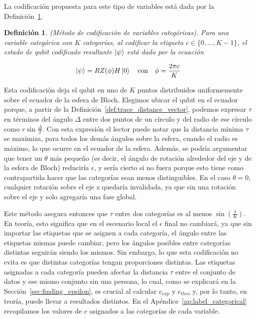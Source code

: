 \documentclass{ieeeaccess}
\newtheorem{definition}{Definición}[section]
\begin{document}
La codificación propuesta para este tipo de variables está dada por la Definición~\ref{def:encoding_categorical}.

\begin{definition}
  (Método de codificación de variables categóricas). Para una variable categórica con $K$ categorías, al codificar la etiqueta $c \in \{0, \dots, K - 1\}$, el estado de qubit codificado resultante $\ket{\psi}$ está dado por la ecuación

  \[
    \ket{\psi} = RZ(\phi)H\ket{0} \quad \text{con} \quad \phi = \frac{2\pi c}{K}
  \]
  \label{def:encoding_categorical}
\end{definition}

Esta codificación deja el qubit en uno de $K$ puntos distribuidos uniformemente sobre el ecuador de la esfera de Bloch. Elegimos ubicar el qubit en el ecuador porque, a partir de la Definición~\ref{def:trace_distance_vector}, podemos expresar $\tau$ en términos del ángulo $\Delta$ entre dos puntos de un círculo y del radio de ese círculo como $r\sin{\frac{\Delta}{2}}$. Con esta expresión el lector puede notar que la distancia mínima $\tau$ se maximiza, para todos los demás ángulos sobre la esfera, cuando el radio es máximo, lo que ocurre en el ecuador de la esfera. Además, se podría argumentar que tener un $\theta$ más pequeño (es decir, el ángulo de rotación alrededor del eje y de la esfera de Bloch) reduciría $\epsilon$, y sería cierto si no fuera porque esto tiene como contrapartida hacer que las categorías sean menos distinguibles. En el caso $\theta = 0$, cualquier rotación sobre el eje z quedaría invalidada, ya que sin una rotación sobre el eje y solo agregaría una fase global.

Este método asegura entonces que $\tau$ entre dos categorías es al menos $\sin(\frac{\pi}{K})$. En teoría, esto significa que en el escenario local el $\epsilon$ final no cambiará, ya que sin importar las etiquetas que se asignen a cada categoría, el ángulo entre las etiquetas mismas puede cambiar, pero los ángulos posibles entre categorías distintas seguirán siendo los mismos. Sin embargo, lo que esta codificación no evita es que distintas categorías tengan proporciones distintas. Las etiquetas asignadas a cada categoría pueden afectar la distancia $\tau$ entre el conjunto de datos y ese mismo conjunto sin una persona, lo cual, como se explicará en la Sección~\ref{sec:finding_epsilon}, es crucial al calcular $\epsilon_{exp}$ y $\epsilon_{theo}$ y, por lo tanto, en teoría, puede llevar a resultados distintos. En el Apéndice~\ref{ap:label_categorical} recopilamos los valores de $c$ asignados a las categorías de cada variable.
\end{document}
